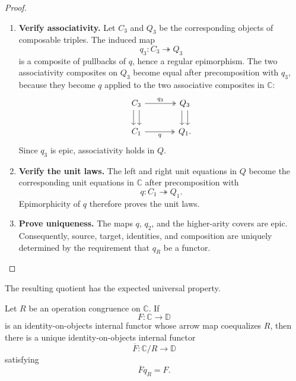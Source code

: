 \begin{proof}
\begin{enumerate}
        \item \textbf{Verify associativity.}
        Let \(C_3\) and \(Q_3\) be the corresponding objects of composable
        triples. The induced map
        \[
            q_3:C_3\twoheadrightarrow Q_3
        \]
        is a composite of pullbacks of \(q\), hence a regular epimorphism.
        The two associativity composites on \(Q_3\) become equal after
        precomposition with \(q_3\), because they become \(q\) applied to the
        two associative composites in \(\mathbb C\):
        \[
        \begin{tikzcd}[column sep=large]
            C_3
                \arrow[r, two heads, "q_3"]
                \arrow[d, shift left=.8ex]
                \arrow[d, shift right=.8ex]
            &
            Q_3
                \arrow[d, shift left=.8ex]
                \arrow[d, shift right=.8ex]
            \\
            C_1
                \arrow[r, two heads, "q"']
            &
            Q_1.
        \end{tikzcd}
        \]
        Since \(q_3\) is epic, associativity holds in \(Q\).

        \item \textbf{Verify the unit laws.}
        The left and right unit equations in \(Q\) become the corresponding
        unit equations in \(\mathbb C\) after precomposition with
        \[
            q:C_1\twoheadrightarrow Q_1.
        \]
        Epimorphicity of \(q\) therefore proves the unit laws.

        \item \textbf{Prove uniqueness.}
        The maps \(q\), \(q_2\), and the higher-arity covers are epic.
        Consequently, source, target, identities, and composition are uniquely
        determined by the requirement that \(q_R\) be a functor.
    \end{enumerate}
\end{proof}

The resulting quotient has the expected universal property.

\begin{proposition}
\label{prop:to-operation-quotient-universal-property}
    Let \(R\) be an operation congruence on \(\mathbb C\). If
    \[
        F:\mathbb C\to\mathbb D
    \]
    is an identity-on-objects internal functor whose arrow map coequalizes
    \(R\), then there is a unique identity-on-objects internal functor
    \[
        \overline F:
        \mathbb C/R\to\mathbb D
    \]
    satisfying
    \[
        \overline Fq_R=F.
    \]
\end{proposition}


